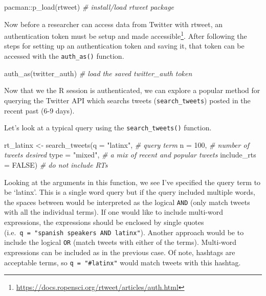 \documentclass[
  letterpaper,
]{latex/krantz}
\newenvironment{Shaded}{\begin{snugshade}}{\end{snugshade}}
\newcommand{\AttributeTok}[1]{\textcolor[rgb]{0.00,0.00,0.00}{#1}}
\newcommand{\CommentTok}[1]{\textcolor[rgb]{0.00,0.00,0.00}{\textit{#1}}}
\newcommand{\ConstantTok}[1]{\textcolor[rgb]{0.00,0.00,0.00}{#1}}
\newcommand{\DecValTok}[1]{\textcolor[rgb]{0.00,0.00,0.00}{#1}}
\newcommand{\FunctionTok}[1]{\textcolor[rgb]{0.00,0.00,0.00}{#1}}
\newcommand{\NormalTok}[1]{\textcolor[rgb]{0.00,0.00,0.00}{#1}}
\newcommand{\OtherTok}[1]{\textcolor[rgb]{0.00,0.00,0.00}{#1}}
\newcommand{\SpecialCharTok}[1]{\textcolor[rgb]{0.00,0.00,0.00}{#1}}
\newcommand{\StringTok}[1]{\textcolor[rgb]{0.00,0.00,0.00}{#1}}
\DeclareRobustCommand{\href}[2]{#2\footnote{\url{#1}}}
\begin{document}
\begin{Shaded}
\begin{Highlighting}[]
\NormalTok{pacman}\SpecialCharTok{::}\FunctionTok{p\_load}\NormalTok{(rtweet) }\CommentTok{\# install/load rtweet package}
\end{Highlighting}
\end{Shaded}

Now before a researcher can access data from Twitter with rtweet,
\href{https://docs.ropensci.org/rtweet/articles/auth.html}{an
authentication token must be setup and made accessible}. After following
the steps for setting up an authentication token and saving it, that
token can be accessed with the \texttt{auth\_as()} function.

\begin{Shaded}
\begin{Highlighting}[]
\FunctionTok{auth\_as}\NormalTok{(twitter\_auth) }\CommentTok{\# load the saved \textasciigrave{}twitter\_auth\textasciigrave{} token}
\end{Highlighting}
\end{Shaded}

Now that we the R session is authenticated, we can explore a popular
method for querying the Twitter API which searchs tweets
(\texttt{search\_tweets}) posted in the recent past (6-9 days).

Let's look at a typical query using the \texttt{search\_tweets()}
function.

\begin{Shaded}
\begin{Highlighting}[]
\NormalTok{rt\_latinx }\OtherTok{\textless{}{-}} 
  \FunctionTok{search\_tweets}\NormalTok{(}\AttributeTok{q =} \StringTok{"latinx"}\NormalTok{, }\CommentTok{\# query term}
                \AttributeTok{n =} \DecValTok{100}\NormalTok{, }\CommentTok{\# number of tweets desired}
                \AttributeTok{type =} \StringTok{"mixed"}\NormalTok{, }\CommentTok{\# a mix of \textasciigrave{}recent\textasciigrave{} and \textasciigrave{}popular\textasciigrave{} tweets}
                \AttributeTok{include\_rts =} \ConstantTok{FALSE}\NormalTok{) }\CommentTok{\# do not include RTs}
\end{Highlighting}
\end{Shaded}

Looking at the arguments in this function, we see I've specified the
query term to be `latinx'. This is a single word query but if the query
included multiple words, the spaces between would be interpreted as the
logical \texttt{AND} (only match tweets with all the individual terms).
If one would like to include multi-word expressions, the expressions
should be enclosed by single quotes
(i.e.~\texttt{q\ =\ "\textquotesingle{}spanish\ speakers\textquotesingle{}\ AND\ latinx"}).
Another approach would be to include the logical \texttt{OR} (match
tweets with either of the terms). Multi-word expressions can be included
as in the previous case. Of note, hashtags are acceptable terms, so
\texttt{q\ =\ "\#latinx"} would match tweets with this hashtag.
\end{document}
